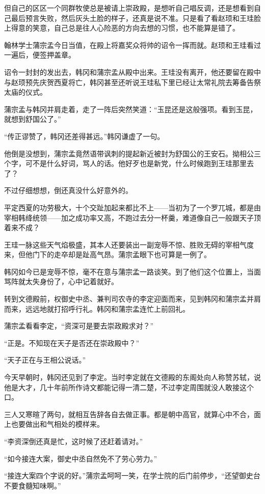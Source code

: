 但自己的区区一个同群牧使总是被请上崇政殿，是想听自己唱反调，还是想看到自己最后预言失败，然后灰头土脸的样子，还真是说不准。只是看了看赵顼和王珪脸上得意的笑意，自己总是往人心险恶的方向去想的习惯，也不能算是错了。

翰林学士蒲宗孟今日当值，在殿上将嘉奖众将帅的诏令一挥而就。赵顼和王珪看过一遍后，便签押盖章。

诏令一封封的发出去，韩冈和蒲宗孟从殿中出来。王珪没有离开，他还要留在殿中与赵顼预先庆贺西夏将亡，韩冈甚至还听说王珪私下里已经让太常礼院去筹备告祭太庙的仪式。

蒲宗孟与韩冈并肩走着，走了一阵后突然笑道：“玉昆还是这般强项。看到玉昆，就想到舒国公了。”

“传正谬赞了，韩冈还差得甚远。”韩冈谦虚了一句。

他倒是没想到，蒲宗孟竟然语带讽刺的提起新近被封为舒国公的王安石。拗相公三个字，可不是什么好词，骂人的话。他好歹也是新党，什么时候跑到王珪那里去了？

不过仔细想想，倒还真没什么好意外的。

平定西夏的功劳极大，十个交趾加起来都比不上——当初为了一个罗兀城，都是由宰相韩绛统领——加之成功率又高，不跑过去分一杯羹，难道像自己一般跟天子顶着来不成？

王珪一脉这些天气焰极盛，其本人还要装出一副宠辱不惊、胜败无碍的宰相气度来，但他门下的走卒却是趾高气昂。蒲宗孟眼下也可算是一例了。

韩冈如今已是宠辱不惊，毫不在意与蒲宗孟一路谈笑。到了他们这个位置上，当面骂阵就太失身份了，心中记着就好。

转到文德殿前，权御史中丞、兼判司农寺的李定迎面而来，见到韩冈和蒲宗孟并肩而来，远远地就打招呼行礼。韩冈和蒲宗孟连忙上前回礼。

蒲宗孟看看李定，“资深可是要去崇政殿求对？”

“正是。不知现在天子是否还在崇政殿中？”

“天子正在与王相公说话。”

今天早朝时，韩冈还见到了李定。当时李定就在文德殿的东阁处向人称赞苏轼，说他是大才，几十年前所作诗文都能记得一清二楚，不过李定周围就没人敢接这个口。

三人又寒暄了两句，就相互告辞各自去做正事。都是朝中高官，就算心中不合，面上也要做出和气相处的模样来。

“李资深倒还真是忙，这时候了还赶着请对。”

“如今接连大案，御史中丞自然免不了劳心劳力。”

“接连大案四个字说的好。”蒲宗孟呵呵一笑，在学士院的后门前停步，“还望御史台不要食髓知味啊。”

